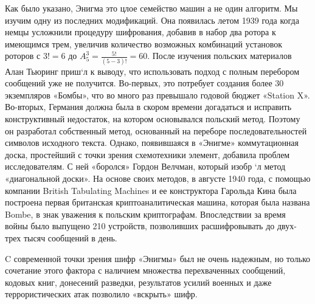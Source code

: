 Как было указано, Энигма это цлое семейство машин а не один 
алгоритм. Мы изучим одну из последних модификаций. Она появилась
летом 1939 года когда немцы усложнили процедуру шифрования, добавив 
в набор два ротора к имеющимся трем, увеличив количество возможных комбинаций 
установок роторов с $3! = 6$ до 
$A_5^3 = \frac{{5!}}{{\left( {5 - 3} \right)!}} = 60$. 
После изучения польских материалов Алан Тьюринг 
приш`л к выводу, что использовать подход с полным перебором сообщений 
уже не получится. Во-первых, это потребует создания более 30 
экземпляров «Бомбы», что во много раз превышало годовой бюджет 
«Station X». Во-вторых, Германия должна была в скором времени 
догадаться и исправить конструктивный недостаток, на котором 
основывался польский метод. Поэтому он разработал собственный 
метод, основанный на переборе последовательностей символов исходного 
текста. Однако, появившаяся в «Энигме» коммутационная доска, 
простейший с точки зрения схемотехники элемент, добавила проблем 
исследователям. С ней «боролся» Гордон Велчман, который изобр
`л метод «диагональной доски». На основе своих методов, в августе 
1940 года, с помощью компании British Tabulating Machines
и ее конструктора Гарольда Кина была 
построена первая британская криптоаналитическая машина, которая 
была названа Bombe, в знак уважения к польским криптографам. 
Впоследствии за время войны было выпущено 210 устройств, позволивших 
расшифровывать до двух-трех тысяч сообщений в день.

C современной точки зрения шифр «Энигмы» был не очень надежным,
но только сочетание этого фактора с наличием множества перехваченных 
сообщений, кодовых книг, донесений разведки, результатов усилий 
военных и даже террористических атак позволило «вскрыть» шифр.
